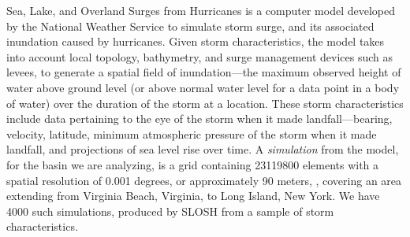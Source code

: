 Sea, Lake, and Overland Surges from Hurricanes \citep{jelesnianski1992} is a 
    computer model developed by the National Weather Service to simulate storm 
    surge, and its associated inundation caused by hurricanes.   Given storm 
    characteristics, the model takes into account local topology, bathymetry, 
    and surge management devices such as levees, to generate a spatial field of 
    inundation---the maximum observed height of water above ground level 
    (or above normal water level for a data point in a body of water) over the 
    duration of the storm at a location.   These storm characteristics include 
    data pertaining to the eye of the storm when it made landfall---bearing, 
    velocity, latitude, minimum atmospheric pressure of the storm when it 
    made landfall, and projections of sea level rise over time.  A 
    \emph{simulation} from the model, for the basin we are analyzing, is a grid 
    containing \num{23119800} elements with a spatial resolution of 
    \num{0.001} degrees, or approximately 90 meters, , 
    covering an area extending from Virginia Beach, Virginia, to Long Island, 
    New York.  We have \num{4000} such simulations, produced by SLOSH from a 
    sample of storm characteristics.


